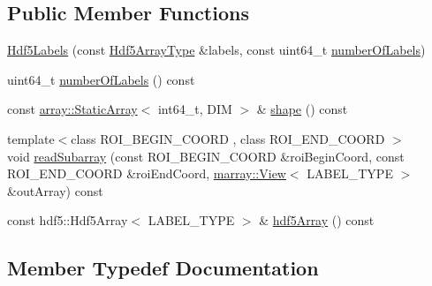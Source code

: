 \subsection*{Public Member Functions}
\begin{DoxyCompactItemize}
\item 
\hyperlink{classnifty_1_1graph_1_1Hdf5Labels_aeaa1ed4dc0066a4c0ee0d176a55c3dd3}{Hdf5\+Labels} (const \hyperlink{classnifty_1_1graph_1_1Hdf5Labels_a2cfeca010fa78ee8fdfa1767ae0fbe4a}{Hdf5\+Array\+Type} \&labels, const uint64\+\_\+t \hyperlink{classnifty_1_1graph_1_1Hdf5Labels_ad4161df4c665904650b8db47c11bf0b9}{number\+Of\+Labels})
\item 
uint64\+\_\+t \hyperlink{classnifty_1_1graph_1_1Hdf5Labels_ad4161df4c665904650b8db47c11bf0b9}{number\+Of\+Labels} () const 
\item 
const \hyperlink{namespacenifty_1_1array_a683f151f19c851754e0c6d55ed16a0c2}{array\+::\+Static\+Array}$<$ int64\+\_\+t, D\+I\+M $>$ \& \hyperlink{classnifty_1_1graph_1_1Hdf5Labels_a11341fbb53d6b96ac4b88ebf24a34629}{shape} () const 
\item 
{\footnotesize template$<$class R\+O\+I\+\_\+\+B\+E\+G\+I\+N\+\_\+\+C\+O\+O\+R\+D , class R\+O\+I\+\_\+\+E\+N\+D\+\_\+\+C\+O\+O\+R\+D $>$ }\\void \hyperlink{classnifty_1_1graph_1_1Hdf5Labels_ae540ccb62e91c55c9e9a163418795956}{read\+Subarray} (const R\+O\+I\+\_\+\+B\+E\+G\+I\+N\+\_\+\+C\+O\+O\+R\+D \&roi\+Begin\+Coord, const R\+O\+I\+\_\+\+E\+N\+D\+\_\+\+C\+O\+O\+R\+D \&roi\+End\+Coord, \hyperlink{classandres_1_1View}{marray\+::\+View}$<$ L\+A\+B\+E\+L\+\_\+\+T\+Y\+P\+E $>$ \&out\+Array) const 
\item 
const hdf5\+::\+Hdf5\+Array$<$ L\+A\+B\+E\+L\+\_\+\+T\+Y\+P\+E $>$ \& \hyperlink{classnifty_1_1graph_1_1Hdf5Labels_a1423d8d5bcadf2251c54260d64fafcd6}{hdf5\+Array} () const 
\end{DoxyCompactItemize}


\subsection{Member Typedef Documentation}
\hypertarget{classnifty_1_1graph_1_1Hdf5Labels_abfffba953f16947d3907634b3aabdcad}{}
